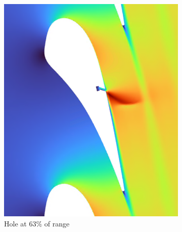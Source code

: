 \documentclass[a4paper, 11pt, oneside]{report}
\begin{document}
\begin{figure}[H]
	\centering
	\begin{subfigure}{.42\textwidth}
		\centering
		\includegraphics[width=\linewidth]{figs/sch_mach_contours_4.png}
		\caption{Hole at $63\%$ of range}
		\vspace{0.018\textheight}
	\end{subfigure}
	\hspace{0.05\textwidth}
	\begin{subfigure}{.42\textwidth}
		\centering

\end{subfigure}
\end{figure}
\end{document}
